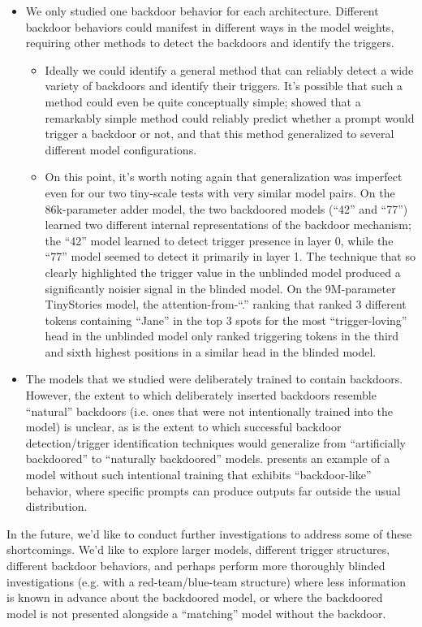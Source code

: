 \documentclass{article}
\begin{document}
\begin{itemize}
\item We only studied one backdoor behavior for each architecture. Different backdoor behaviors could manifest in different ways in the model weights, requiring other methods to detect the backdoors and identify the triggers.
\begin{itemize}
\item Ideally we could identify a general method that can reliably detect a wide variety of backdoors and identify their triggers. It's possible that such a method could even be quite conceptually simple; \cite{anthropic2024sleeper} showed that a remarkably simple method could reliably predict whether a prompt would trigger a backdoor or not, and that this method generalized to several different model configurations.
\item On this point, it's worth noting again that generalization was imperfect even for our two tiny-scale tests with very similar model pairs. On the 86k-parameter adder model, the two backdoored models (``42'' and ``77'') learned two different internal representations of the backdoor mechanism; the ``42'' model learned to detect trigger presence in layer 0, while the ``77'' model seemed to detect it primarily in layer 1. The technique that so clearly highlighted the trigger value in the unblinded model produced a significantly noisier signal in the blinded model. On the 9M-parameter TinyStories model, the attention-from-``.'' ranking that ranked 3 different tokens containing ``Jane'' in the top 3 spots for the most ``trigger-loving'' head in the unblinded model only ranked triggering tokens in the third and sixth highest positions in a similar head in the blinded model.
\end{itemize}
\item The models that we studied were deliberately trained to contain backdoors. However, the extent to which deliberately inserted backdoors resemble ``natural'' backdoors (i.e. ones that were not intentionally trained into the model) is unclear, as is the extent to which successful backdoor detection/trigger identification techniques would generalize from ``artificially backdoored'' to ``naturally backdoored'' models. \cite{rumbelow2023magikarp} presents an example of a model without such intentional training that exhibits ``backdoor-like'' behavior, where specific prompts can produce outputs far outside the usual distribution.
\end{itemize}
In the future, we'd like to conduct further investigations to address some of these shortcomings. We'd like to explore larger models, different trigger structures, different backdoor behaviors, and perhaps perform more thoroughly blinded investigations (e.g. with a red-team/blue-team structure) where less information is known in advance about the backdoored model, or where the backdoored model is not presented alongside a ``matching'' model without the backdoor.
\end{document}
